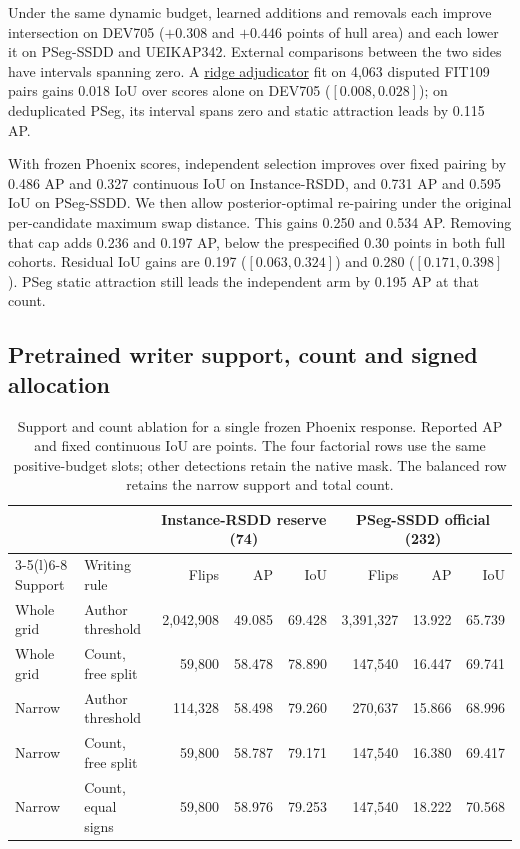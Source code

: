 \documentclass[journal]{IEEEtran}
\begin{document}
Under the same dynamic budget, learned additions and removals each improve intersection on DEV705 (\(+0.308\) and \(+0.446\) points of hull area) and each lower it on PSeg-SSDD and UEIKAP342. External comparisons between the two sides have intervals spanning zero. A \href{https://github.com/bingzhi495-creator/SAR-SEAL-research/blob/3f8f738/research_round_20260925_global/ATTRACTION_LOCAL_CORRECTION_ACTUAL_20261123.md}{ridge adjudicator} fit on 4,063 disputed FIT109 pairs gains 0.018 IoU over scores alone on DEV705 (\([0.008,0.028]\)); on deduplicated PSeg, its interval spans zero and static attraction leads by 0.115 AP.

With frozen Phoenix scores, independent selection improves over fixed pairing by 0.486 AP and 0.327 continuous IoU on Instance-RSDD, and 0.731 AP and 0.595 IoU on PSeg-SSDD. We then allow posterior-optimal re-pairing under the original per-candidate maximum swap distance. This gains 0.250 and 0.534 AP. Removing that cap adds 0.236 and 0.197 AP, below the prespecified 0.30 points in both full cohorts. Residual IoU gains are 0.197 (\([0.063,0.324]\)) and 0.280 (\([0.171,0.398]\)). PSeg static attraction still leads the independent arm by 0.195 AP at that count.

\subsection{Pretrained writer support, count and signed allocation}
\begin{table}[t]
\centering
\caption{Support and count ablation for a single frozen Phoenix response. Reported AP and fixed continuous IoU are points. The four factorial rows use the same positive-budget slots; other detections retain the native mask. The balanced row retains the narrow support and total count.}
\label{tab:phoenix-factors}
\footnotesize
\setlength{\tabcolsep}{5pt}
\begin{tabular}{@{}llrrr@{\quad}rrr@{}}
\toprule
 & & \multicolumn{3}{c}{Instance-RSDD reserve (74)} & \multicolumn{3}{c}{PSeg-SSDD official (232)}\\
\cmidrule(lr){3-5}\cmidrule(l){6-8}
Support & Writing rule & Flips & AP & IoU & Flips & AP & IoU\\
\midrule
Whole grid & Author threshold & 2,042,908 & 49.085 & 69.428 & 3,391,327 & 13.922 & 65.739\\
Whole grid & Count, free split & 59,800 & 58.478 & 78.890 & 147,540 & 16.447 & 69.741\\
Narrow & Author threshold & 114,328 & 58.498 & 79.260 & 270,637 & 15.866 & 68.996\\
Narrow & Count, free split & 59,800 & 58.787 & 79.171 & 147,540 & 16.380 & 69.417\\
Narrow & Count, equal signs & 59,800 & 58.976 & 79.253 & 147,540 & 18.222 & 70.568\\
\bottomrule
\end{tabular}
\end{table}
\end{document}
